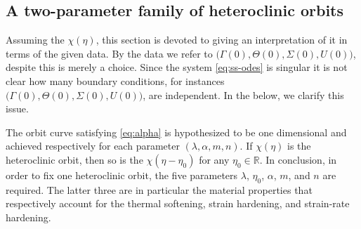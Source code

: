 \documentclass[a4paper,11pt]{article}
\def\BO{{\mathcal{O}}}
\theoremstyle{remark}
\begin{document}
%

\subsection{A two-parameter family of heteroclinic orbits} \label{sec:twoparam}
Assuming the $\chi(\eta)$, this section is devoted to giving an interpretation of it in terms of the given data. By the data we refer to $\big(\Gamma(0),\Theta(0),\Sigma(0),U(0)\big)$, despite this is merely a choice. Since the system \eqref{eq:ss-odes} is singular it is not clear how many boundary conditions, for instances $\big(\Gamma(0),\Theta(0),\Sigma(0),U(0)\big)$, are independent. In the below, we clarify this issue.

The orbit curve satisfying \eqref{eq:alpha} is hypothesized to be one dimensional and achieved respectively for each parameter $(\lambda, \alpha, m,n)$. If $\chi(\eta)$ is the heteroclinic orbit, then so is the $\chi(\eta-\eta_0)$ for any $\eta_0\in \mathbb{R}$. In conclusion, in order to fix one heteroclinic orbit, the five parameters $\lambda$, $\eta_0$, $\alpha$, $m$, and $n$ are required. The latter three are in particular the material properties that respectively account for the thermal softening, strain hardening, and strain-rate hardening.
\end{document}
